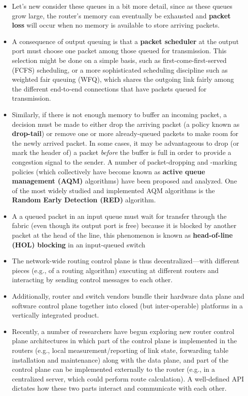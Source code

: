 \begin{itemize}
\item
Let's new consider these queues in a bit more detail, since as these queues grow large, the router's memory can eventually be exhausted and \textbf{packet loss} will occur when no memory is available to store arriving packets.

\item
A consequence of output queuing is that a \textbf{packet scheduler} at the output port must choose one packet among those queued for transmission. This selection might be done on a simple basis, such as first-come-first-served (FCFS) scheduling, or a more sophisticated scheduling discipline such as weighted fair queuing (WFQ), which shares the outgoing link fairly among the different end-to-end connections that have packets queued for transmission.

\item
Similarly, if there is not enough memory to buffer an incoming packet, a decision must be made to either drop the arriving packet (a policy known as \textbf{drop-tail}) or remove one or more already-queued packets to make room for the newly arrived packet. In some cases, it may be advantageous to drop (or mark the header of) a packet \textit{before} the buffer is full in order to provide a congestion signal to the sender. A number of packet-dropping and -marking policies (which collectively have become known as \textbf{active queue management (AQM)} algorithms) have been proposed and analyzed. One of the most widely studied and implemented AQM algorithms is the \textbf{Random Early Detection (RED)} algorithm.

\item
A a queued packet in an input queue must wait for transfer through the fabric (even though its output port is free) because it is blocked by another packet at the head of the line, this phenomenon is known as \textbf{head-of-line (HOL) blocking} in an input-queued switch

\item
The network-wide routing control plane is thus decentralized---with different pieces (e.g., of a routing algorithm) executing at different routers and interacting by sending control messages to each other.

\item
Additionally, router and switch vendors bundle their hardware data plane and software control plane together into closed (but inter-operable) platforms in a vertically integrated product.

\item
Recently, a number of researchers have begun exploring new router control plane architectures in which part of the control plane is implemented in the routers (e.g., local measurement/reporting of link state, forwarding table installation and maintenance) along with the data plane, and part of the control plane can be implemented externally to the router (e.g., in a centralized server, which could perform route calculation). A well-defined API dictates how these two parts interact and communicate with each other.


\end{itemize}
